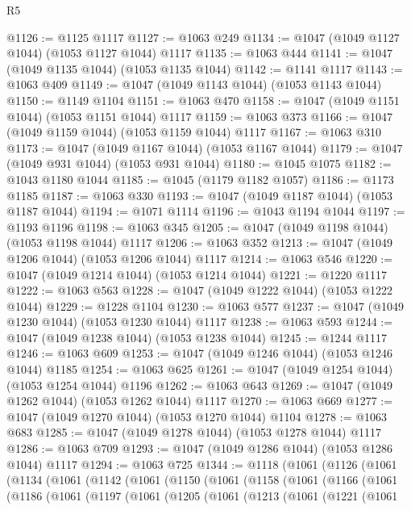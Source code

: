 \begin{lexlean}{R5}
\begin{coremodule}
@1126 := @1125 @1117
@1127 := @1063 @249
@1134 := @1047 (@1049 @1127 @1044) (@1053 @1127 @1044) @1117
@1135 := @1063 @444
@1141 := @1047 (@1049 @1135 @1044) (@1053 @1135 @1044)
@1142 := @1141 @1117
@1143 := @1063 @409
@1149 := @1047 (@1049 @1143 @1044) (@1053 @1143 @1044)
@1150 := @1149 @1104
@1151 := @1063 @470
@1158 := @1047 (@1049 @1151 @1044) (@1053 @1151 @1044) @1117
@1159 := @1063 @373
@1166 := @1047 (@1049 @1159 @1044) (@1053 @1159 @1044) @1117
@1167 := @1063 @310
@1173 := @1047 (@1049 @1167 @1044) (@1053 @1167 @1044)
@1179 := @1047 (@1049 @931 @1044) (@1053 @931 @1044)
@1180 := @1045 @1075
@1182 := @1043 @1180 @1044
@1185 := @1045 (@1179 @1182 @1057)
@1186 := @1173 @1185
@1187 := @1063 @330
@1193 := @1047 (@1049 @1187 @1044) (@1053 @1187 @1044)
@1194 := @1071 @1114
@1196 := @1043 @1194 @1044
@1197 := @1193 @1196
@1198 := @1063 @345
@1205 := @1047 (@1049 @1198 @1044) (@1053 @1198 @1044) @1117
@1206 := @1063 @352
@1213 := @1047 (@1049 @1206 @1044) (@1053 @1206 @1044) @1117
@1214 := @1063 @546
@1220 := @1047 (@1049 @1214 @1044) (@1053 @1214 @1044)
@1221 := @1220 @1117
@1222 := @1063 @563
@1228 := @1047 (@1049 @1222 @1044) (@1053 @1222 @1044)
@1229 := @1228 @1104
@1230 := @1063 @577
@1237 := @1047 (@1049 @1230 @1044) (@1053 @1230 @1044) @1117
@1238 := @1063 @593
@1244 := @1047 (@1049 @1238 @1044) (@1053 @1238 @1044)
@1245 := @1244 @1117
@1246 := @1063 @609
@1253 := @1047 (@1049 @1246 @1044) (@1053 @1246 @1044) @1185
@1254 := @1063 @625
@1261 := @1047 (@1049 @1254 @1044) (@1053 @1254 @1044) @1196
@1262 := @1063 @643
@1269 := @1047 (@1049 @1262 @1044) (@1053 @1262 @1044) @1117
@1270 := @1063 @669
@1277 := @1047 (@1049 @1270 @1044) (@1053 @1270 @1044) @1104
@1278 := @1063 @683
@1285 := @1047 (@1049 @1278 @1044) (@1053 @1278 @1044) @1117
@1286 := @1063 @709
@1293 := @1047 (@1049 @1286 @1044) (@1053 @1286 @1044) @1117
@1294 := @1063 @725
@1344 := @1118
    (@1061
      (@1126
        (@1061
          (@1134
            (@1061
              (@1142
                (@1061
                  (@1150
                    (@1061
                      (@1158
                        (@1061
                          (@1166
                            (@1061
                              (@1186
                                (@1061
                                  (@1197
                                    (@1061
                                      (@1205
                                        (@1061
                                          (@1213
                                            (@1061
                                              (@1221
                                                (@1061

\end{coremodule}
\end{lexlean}
